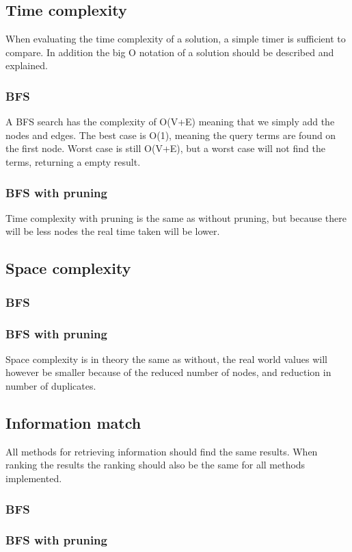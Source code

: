 \subsection{Time complexity}
When evaluating the time complexity of a solution, a simple timer is sufficient to compare. In addition the big O notation of a solution should be described and explained.

\subsubsection{BFS}
A BFS search has the complexity of O(V+E) \cite{Something} meaning that we simply add the nodes and edges. The best case is O(1), meaning the query terms are found on the first node. Worst case is still O(V+E), but a worst case will not find the terms, returning a empty result.\\

\subsubsection{BFS with pruning}
Time complexity with pruning is the same as without pruning, but because there will be less nodes the real time taken will be lower.\\

\subsection{Space complexity}
\subsubsection{BFS}

\subsubsection{BFS with pruning}
Space complexity is in theory the same as without, the real world values will however be smaller because of the reduced number of nodes, and reduction in number of duplicates.\\

\subsection{Information match}
All methods for retrieving information should find the same results. When ranking the results the ranking should also be the same for all methods implemented.\\

\subsubsection{BFS}

\subsubsection{BFS with pruning}


\clearpage